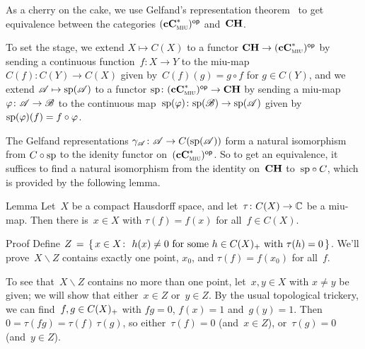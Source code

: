 \documentclass[main]{subfiles}
\begin{document}
\begin{parsec}%
\begin{point}%
As a cherry on the cake,
we use Gelfand's representation theorem~
to get equivalence between the categories ${(\mathbf{cC}^*_{\text{\textsc{miu}}})}{^{\mathsf{op}}}$
and~$\mathbf{CH}$.

To set the stage,
we extend $X\mapsto C(X)$ to a functor
$\mathbf{CH}\to {(\mathbf{cC}^*_{\text{\textsc{miu}}})}{^{\mathsf{op}}}$
by sending a continuous function~$f\colon X\to Y$
to the miu-map $C(f)\colon C(Y)\to C(X)$
given by~$C(f)(g)=g\circ f$ for $g\in C(Y)$,
and we extend $\mathscr{A}\mapsto \mathrm{sp}(\mathscr{A})$
to a functor $\mathrm{sp}\colon {(\mathbf{cC}^*_{\text{\textsc{miu}}})}{^{\mathsf{op}}}\to \mathbf{CH}$
by sending a miu-map $\varphi \colon \mathscr{A}\to\mathscr{B}$
to the continuous map~$\mathrm{sp}(\varphi)\colon \mathrm{sp}(\mathscr{B})\to\mathrm{sp}(\mathscr{A})$
given by~$\mathrm{sp}(\varphi)(f)=f\circ \varphi$.

The Gelfand representations $\gamma_{\mathscr{A}}\colon \mathscr{A}\to C(\mathrm{sp}(\mathscr{A}))$
form a natural isomorphism
from $C\circ \mathrm{sp}$ to the idenity functor on~${(\mathbf{cC}^*_{\text{\textsc{miu}}})}{^{\mathsf{op}}}$.
So to get an equivalence,
it suffices to find a natural isomorphism
from the identity on~$\mathbf{CH}$ to~$\mathrm{sp}\circ C$,
which is provided by the following lemma.
\end{point}
\begin{point}{Lemma}%
Let~$X$ be a compact Hausdorff space,
and let~$\tau \colon C(X)\to \mathbb{C}$ be a miu-map.
Then there is~$x\in X$ with $\tau(f)=f (x)$
for all~$f\in C(X)$.
\begin{point}{Proof}%
Define
$Z\,= \, \{\,x\in X\colon \ h(x)\neq 0\text{ for some~$h\in C(X)_{+}$
with $\tau(h)=0$}\,\}$.
We'll prove~$X\backslash Z$ contains
exactly one point, $x_0$, and $\tau(f)=f(x_0)$ for all~$f$.
\begin{point}%
To see that~$X\backslash Z$ contains no more than one point,
let~$x,y\in X$ with $x\neq y$ be given;
we will show that either~$x\in Z$ or~$y\in Z$.
By the usual topological trickery,
we can find~$f,g\in C(X)_{+}$
with $fg=0$, $f(x)=1$ and~$g(y)=1$.
Then~$0=\tau(fg)=\tau(f)\,\tau(g)$,
so either~$\tau(f)=0$ (and~$x\in Z$), or~$\tau(g)=0$
(and~$y\in Z$).


\end{point}
\end{point}
\end{point}
\end{parsec}
\end{document}
